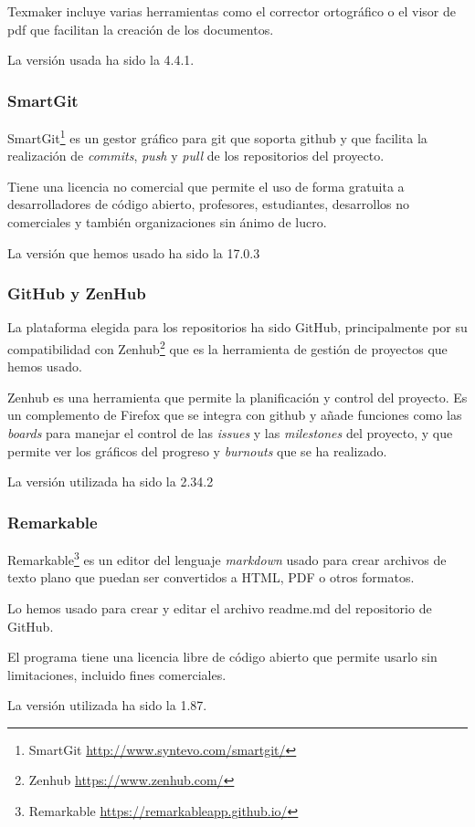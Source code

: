 Texmaker incluye varias herramientas como el corrector ortográfico o el visor de pdf que facilitan la creación de los documentos.

La versión usada ha sido la 4.4.1.

\subsubsection{SmartGit}
SmartGit\footnote{SmartGit \url{http://www.syntevo.com/smartgit/}} es un gestor gráfico para git que soporta github y que facilita la realización de \textit{commits}, \textit{push} y \textit{pull} de los repositorios del proyecto.

Tiene una licencia no comercial que permite el uso de forma gratuita a desarrolladores de código abierto, profesores, estudiantes, desarrollos no comerciales y también organizaciones sin ánimo de lucro.

La versión que hemos usado ha sido la 17.0.3

\subsubsection{GitHub y ZenHub}
La plataforma elegida para los repositorios ha sido GitHub, principalmente por su compatibilidad con Zenhub\footnote{Zenhub \url{https://www.zenhub.com/}} que es la herramienta de gestión de proyectos que hemos usado.

Zenhub es una herramienta que permite la planificación y control del proyecto. Es un complemento de Firefox que se integra con github y añade funciones como las \textit{boards} para manejar el control de las \textit{issues} y las \textit{milestones} del proyecto, y que permite ver los gráficos del progreso y \textit{burnouts} que se ha realizado.

La versión utilizada ha sido la 2.34.2

\subsubsection{Remarkable}
Remarkable\footnote{Remarkable \url{https://remarkableapp.github.io/}} es un editor del lenguaje \textit{markdown} usado para crear archivos de texto plano que puedan ser convertidos a HTML, PDF o otros formatos.

Lo hemos usado para crear y editar el archivo readme.md del repositorio de GitHub.

El programa tiene una licencia libre de código abierto que permite usarlo sin limitaciones, incluido fines comerciales.

La versión utilizada ha sido la 1.87.

